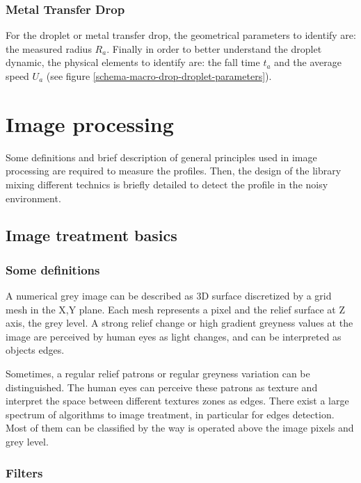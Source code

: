\documentclass[12pt]{iopart}
\begin{document}
\subsubsection{ Metal Transfer Drop}
\label{ metam_transfer_drop}

For the droplet or metal transfer drop, the geometrical parameters to identify are:
 the measured radius $R_{a}$. 
Finally in order to better understand the droplet dynamic, 
the physical elements to identify are: the fall time $t_{a}$ and the average 
speed $U_{a}$ (see figure \ref{schema-macro-drop-droplet-parameters}).



\section{Image processing} 

Some definitions and brief description of general principles used in
 image processing are required to measure the profiles. Then, the design of the library 
mixing different technics
is briefly detailed  to detect the profile in the noisy environment.


\subsection{Image treatment basics}
\subsubsection{Some definitions}\label{some_definitions}
A numerical grey image can be described as 3D surface discretized by a grid mesh
 in the X,Y plane. Each mesh represents a pixel and the relief surface at Z axis,
 the grey level. 
A strong relief change or high gradient greyness values at
 the image are perceived by human eyes as light changes, and can be interpreted
 as objects edges. 

Sometimes, a regular relief patrons or regular greyness
 variation can be distinguished. The human eyes can perceive these patrons as texture 
and interpret the space between different textures zones as edges.
There exist a large spectrum of algorithms to image treatment, in particular for edges detection.
 Most of them can be classified by the way  is operated above the image pixels and grey level.

\subsubsection{Filters}\label{filters}
\end{document}
